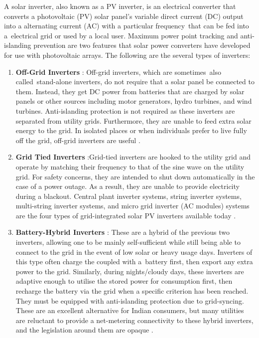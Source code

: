 \documentclass[a4paper,12pt]{iitmdiss}
\begin{document}
A solar inverter, also known as a PV inverter, is an electrical converter that converts a photovoltaic (PV) solar panel's variable direct current (DC) output into a alternating current (AC)  with a particular frequency that can be fed into a electrical grid or used by a local user. Maximum power point tracking and anti-islanding prevention are two features that solar power converters have developed for use with photovoltaic arrays. The following are the several types of inverters:
\begin{enumerate}
    \item \textbf{Off-Grid Inverters} : Off-grid inverters, which are sometimes also called stand-alone inverters, do not require that a solar panel be connected to them. Instead, they get DC power from batteries that are charged by solar panels or other sources including motor generators, hydro turbines, and wind turbines. Anti-islanding protection is not required as these inverters are separated from utility grids. Furthermore, they are unable to feed extra solar energy to the grid. In isolated places or when individuals prefer to live fully off the grid, off-grid inverters are useful \textcolor{blue}{\cite{oorjanblog_2018}}.
    \item \textbf{Grid Tied Inverters} :Grid-tied inverters are hooked to the utility grid and operate by matching their frequency to that of the sine wave on the utility grid. For safety concerns, they are intended to shut down automatically in the case of a power outage. As a result, they are unable to provide electricity during a blackout. Central plant inverter systems, string inverter systems, multi-string inverter systems, and micro grid inverter (AC modules) systems are the four types of grid-integrated solar PV inverters available today \textcolor{blue}{\cite{oorjanblog_2018}}.
    \item \textbf{Battery-Hybrid Inverters} : These are a hybrid of the previous two inverters, allowing one to be mainly self-sufficient while still being able to connect to the grid in the event of low solar or heavy usage days. Inverters of this type often charge the coupled with a battery first, then export any extra power to the grid. Similarly, during nights/cloudy days, these inverters are adaptive enough to utilise the stored power for consumption first, then recharge the battery via the grid when a specific criterion has been reached. They must be equipped with anti-islanding protection due to grid-syncing. These are an excellent alternative for Indian consumers, but many utilities are reluctant to provide a net-metering connectivity to these hybrid inverters, and the legislation around them are opaque \textcolor{blue}{\cite{oorjanblog_2018}}.

\end{enumerate}
\end{document}
